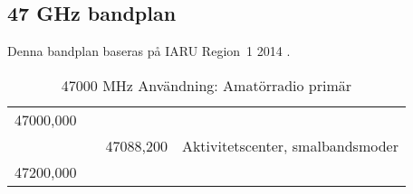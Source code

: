 \subsection{47 GHz bandplan}
\label{47GHzbandplan}
Denna bandplan baseras på IARU Region~1 2014 \cite{IARU1}.

\begin{table}[thp]
  \caption{47000 MHz Användning: Amatörradio primär} 
  \begin{xtabular}{llll}
47000,000 & & & \\
          & & 47088,200 & Aktivitetscenter, smalbandsmoder \\
47200,000 & & & \\
\end{xtabular}
\end{table}

\twocolumn
